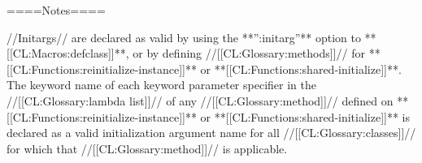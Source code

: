 ====Notes====

//Initargs// are declared as valid by using the **'':initarg''** option to **[[CL:Macros:defclass]]**, or by defining //[[CL:Glossary:methods]]// for **[[CL:Functions:reinitialize-instance]]** or **[[CL:Functions:shared-initialize]]**. The keyword name of each keyword parameter specifier in the //[[CL:Glossary:lambda list]]// of any //[[CL:Glossary:method]]// defined on **[[CL:Functions:reinitialize-instance]]** or **[[CL:Functions:shared-initialize]]** is declared as a valid initialization argument name for all //[[CL:Glossary:classes]]// for which that //[[CL:Glossary:method]]// is applicable.


